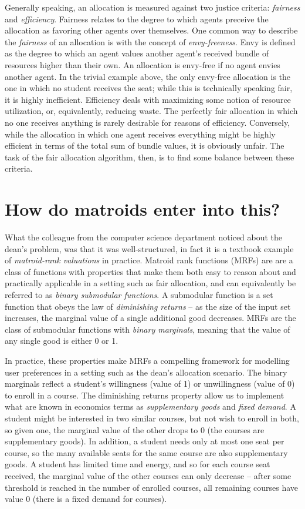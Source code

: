 Generally speaking, an allocation is measured against two justice criteria: \textit{fairness} and \textit{efficiency}. Fairness relates to the degree to which agents preceive the allocation as favoring other agents over themselves. One common way to describe the \textit{fairness} of an allocation is with the concept of \textit{envy-freeness}. Envy is defined as the degree to which an agent values another agent's received bundle of resources higher than their own. An allocation is envy-free if no agent envies another agent. In the trivial example above, the only envy-free allocation is the one in which no student receives the seat; while this is technically speaking fair, it is highly inefficient. Efficiency deals with maximizing some notion of resource utilization, or, equivalently, reducing waste. The perfectly fair allocation in which no one receives anything is rarely desirable for reasons of efficiency. Conversely, while the allocation in which one agent receives everything might be highly efficient in terms of the total sum of bundle values, it is obviously unfair. The task of the fair allocation algorithm, then, is to find some balance between these criteria.

\section*{How do matroids enter into this?}
What the colleague from the computer science department noticed about the dean's problem, was that it was well-structured, in fact it is a textbook example of \textit{matroid-rank valuations} in practice. Matroid rank functions (MRFs) are are a class of functions with properties that make them both easy to reason about and practically applicable in a setting such as fair allocation, and can equivalently be referred to as \textit{binary submodular functions}. A submodular function is a set function that obeys the law of \textit{diminishing returns} -- as the size of the input set increases, the marginal value of a single additional good decreases. MRFs are the class of submodular functions with \textit{binary marginals}, meaning that the value of any single good is either 0 or 1.

In practice, these properties make MRFs a compelling framework for modelling user preferences in a setting such as the dean's allocation scenario. The binary marginals reflect a student's willingness (value of 1) or unwillingness (value of 0) to enroll in a course. The diminishing returns property allow us to implement what are known in economics terms as \textit{supplementary goods} and \textit{fixed demand}. A student might be interested in two similar courses, but not wish to enroll in both, so given one, the marginal value of the other drops to 0 (the courses are supplementary goods). In addition, a student needs only at most one seat per course, so the many available seats for the same course are also supplementary goods. A student has limited time and energy, and so for each course seat received, the marginal value of the other courses can only decrease -- after some threshold is reached in the number of enrolled courses, all remaining courses have value 0 (there is a fixed demand for courses).

